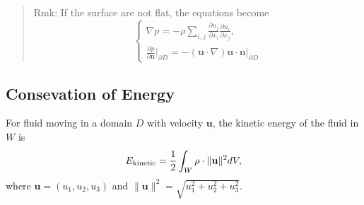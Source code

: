 \begin{quote}
	Rmk:
If the surface are not flat, the equations become
\begin{equation}
\begin{cases}
\displaystyle \nabla p
= - \rho \sum_{i,j}\frac{\partial u_j}{\partial x_i}\frac{\partial u_i}{\partial x_j},\\
\displaystyle \frac{\partial p}{\partial \textbf{n}}\Bigg|_{\partial D}
= - \left(\textbf{u}\cdot\nabla\right)\textbf{u}\cdot \textbf{n}\Bigg|_{\partial D}
\end{cases}
\end{equation}

\end{quote}


\subsection{Consevation of Energy} %

For fluid moving in a domain $D$ with velocity $\textbf{u}$, the kinetic energy of the fluid in $W$ is 
\begin{equation}
E_{\rm kinetic} = \frac{1}{2}\int_{W}\rho \cdot \lVert\textbf{u}\rVert^2 dV,
\end{equation}
where $\textbf{u} = (u_1,u_2,u_3)$ and $\lVert\textbf{u}\rVert^2 = \sqrt{u_1^2+u_2^2+u_3^2}$.





